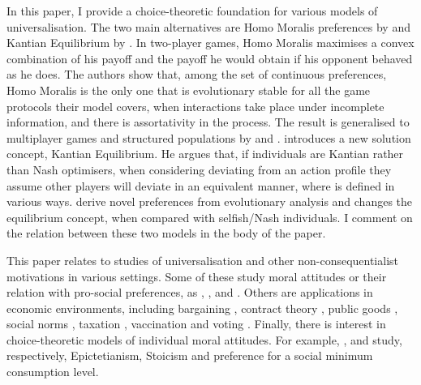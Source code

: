 In this paper, I provide a choice-theoretic foundation for various models of universalisation. The two main alternatives are Homo Moralis preferences by \cite{algerHomoMoralisPreference2013,alger2016evolution,algerEvolutionPreferencesStructured2020} and Kantian Equilibrium by \cite{roemerKantianEquilibrium2010,roemerKantianOptimizationMicrofoundation2015,roemer2019cooperate}. In two-player games, Homo Moralis maximises a convex combination of his payoff and the payoff he would obtain if his opponent behaved as he does. The authors show that, among the set of continuous preferences, Homo Moralis is the only one that is  evolutionary stable for all the game protocols their model covers, when interactions take place under incomplete information, and there is assortativity in the process. The result is generalised to multiplayer games and structured populations by \cite{alger2016evolution} and \cite{algerEvolutionPreferencesStructured2020}. \cite{roemer2019cooperate} introduces a new solution concept, Kantian Equilibrium. He argues that, if individuals are Kantian rather than Nash optimisers, when considering deviating from an action profile they assume other players will deviate in an equivalent manner, where  is defined in various ways. \citeauthor{algerHomoMoralisPreference2013} derive novel preferences from evolutionary analysis and \citeauthor{roemerKantianOptimizationMicrofoundation2015} changes the equilibrium concept, when compared with selfish/Nash individuals. I comment on the relation between these two models in the body of the paper.

This paper relates to studies of universalisation and other non-consequentialist motivations in various settings. Some of these study moral attitudes or their relation with pro-social preferences, as \cite{dewatripontMoralityMarkets2024}, \cite{ellingsenModelSocialDuties2024}, \cite{fleurbaey2023moralmotives} and \cite{laslierUniversalizationAltruism2022}. Others are applications in economic environments, including bargaining \citep{dizarlarKantianEquilibriaClass2023,juan-bartroliMoralPreferencesBargaining2024}, contract theory \citep{sarkisianTeamIncentivesMoral2017,sarkisianOptimalIncentivesSchemes2021,sarkisianScreeningTeamsMoral2021}, public goods \citep{brekkeEconomicModelMoral2003a}, social norms \citep{juan-bartroliInjunctiveNormsTheory2024}, taxation \citep{RePEc:ces:ceswps:_9867}, vaccination \citep{dedonderNashKantGametheoretic2025} and voting \citep{algerHomoMoralisGoes2022,dierksDoesUniversalizationEthics2024,grilloEthicalVotingHeterogenous2022}. Finally, there is interest in choice-theoretic models of individual moral attitudes. For example, \cite{ponthiereEpictetusianRationality2024}, \cite{ponthiere2024stoicism} and \cite{shiEndogenousSocialMinimum2024} study, respectively, Epictetianism, Stoicism and preference for a social minimum consumption level.

